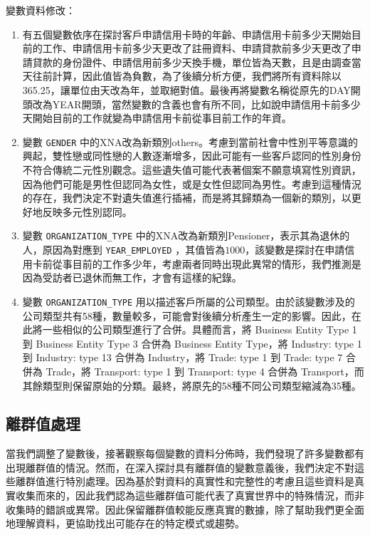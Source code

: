 \documentclass[12pt, a4paper]{article}
\begin{document}
變數資料修改：

\begin{enumerate}

\item 有五個變數依序在探討客戶申請信用卡時的年齡、申請信用卡前多少天開始目前的工作、申請信用卡前多少天更改了註冊資料、申請貸款前多少天更改了申請貸款的身份證件、申請信用前多少天換手機，單位皆為天數，且是由調查當天往前計算，因此值皆為負數，為了後續分析方便，我們將所有資料除以365.25，讓單位由天改為年，並取絕對值。最後再將變數名稱從原先的DAY開頭改為YEAR開頭，當然變數的含義也會有所不同，比如說申請信用卡前多少天開始目前的工作就變為申請信用卡前從事目前工作的年資。

\item 變數 \verb|GENDER| 中的XNA改為新類別others。考慮到當前社會中性別平等意識的興起，雙性戀或同性戀的人數逐漸增多，因此可能有一些客戶認同的性別身份不符合傳統二元性別觀念。這些遺失值可能代表著個案不願意填寫性別資訊，因為他們可能是男性但認同為女性，或是女性但認同為男性。考慮到這種情況的存在，我們決定不對遺失值進行插補，而是將其歸類為一個新的類別，以更好地反映多元性別認同。

\item 變數 \verb|ORGANIZATION_TYPE| 中的XNA改為新類別Pensioner，表示其為退休的人，原因為對應到 \verb|YEAR_EMPLOYED| ，其值皆為$1000$，該變數是探討在申請信用卡前從事目前的工作多少年，考慮兩者同時出現此異常的情形，我們推測是因為受訪者已退休而無工作，才會有這樣的紀錄。

\item 變數 \verb|ORGANIZATION_TYPE| 用以描述客戶所屬的公司類型。由於該變數涉及的公司類型共有58種，數量較多，可能會對後續分析產生一定的影響。因此，在此將一些相似的公司類型進行了合併。具體而言，將 Business Entity Type 1 到 Business Entity Type 3 合併為 Business Entity Type，將 Industry: type 1 到 Industry: type 13 合併為 Industry，將 Trade: type 1 到 Trade: type 7 合併為 Trade，將 Transport: type 1 到 Transport: type 4 合併為 Transport，而其餘類型則保留原始的分類。最終，將原先的58種不同公司類型縮減為35種。


\end{enumerate}


\subsection{離群值處理}

當我們調整了變數後，接著觀察每個變數的資料分佈時，我們發現了許多變數都有出現離群值的情況。然而，在深入探討具有離群值的變數意義後，我們決定不對這些離群值進行特別處理。因為基於對資料的真實性和完整性的考慮且這些資料是真實收集而來的，因此我們認為這些離群值可能代表了真實世界中的特殊情況，而非收集時的錯誤或異常。因此保留離群值較能反應真實的數據，除了幫助我們更全面地理解資料，更協助找出可能存在的特定模式或趨勢。
\end{document}
